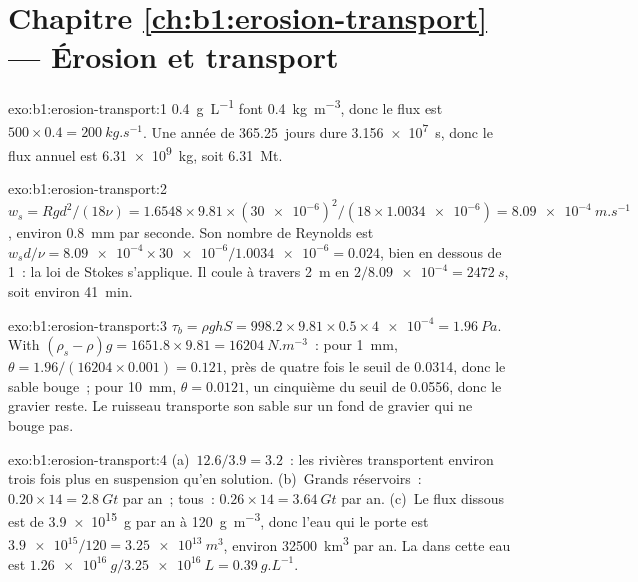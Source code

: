 \section*{Chapitre \ref{ch:b1:erosion-transport} --- Érosion et transport}

\begin{solution}{exo:b1:erosion-transport:1}
\qty{0.4}{g.L^{-1}} font \qty{0.4}{kg.m^{-3}}, donc le flux est $500 \times 0.4 =
\qty{200}{kg.s^{-1}}$. Une année de \num{365.25}~jours dure
\qty{3.156e7}{s}, donc le flux annuel est \qty{6.31e9}{kg}, soit
\qty{6.31}{Mt}.
\end{solution}

\begin{solution}{exo:b1:erosion-transport:2}
$w_s = R g d^2/(18\nu) = 1.6548 \times 9.81 \times (\num{30e-6})^2/(18 \times
\num{1.0034e-6}) = \qty{8.09e-4}{m.s^{-1}}$, environ \qty{0.8}{mm} par seconde. Son
nombre de Reynolds est $w_s d/\nu = \num{8.09e-4} \times
\num{30e-6}/\num{1.0034e-6} = 0.024$, bien en dessous de 1~: la loi de Stokes s'applique. Il
coule à travers \qty{2}{m} en $2/\num{8.09e-4} = \qty{2472}{s}$, soit environ
\qty{41}{min}.
\end{solution}

\begin{solution}{exo:b1:erosion-transport:3}
$\tau_b = \rho g h S = 998.2 \times 9.81 \times 0.5 \times \num{4e-4} =
\qty{1.96}{Pa}$. With $(\rho_s - \rho) g = 1651.8 \times 9.81 =
\qty{16204}{N.m^{-3}}$~: pour \qty{1}{mm}, $\theta = 1.96/(16204 \times 0.001) =
0.121$, près de quatre fois le seuil de \num{0.0314}, donc le sable bouge~; pour
\qty{10}{mm}, $\theta = 0.0121$, un cinquième du seuil de \num{0.0556}, donc le
gravier reste. Le ruisseau transporte son sable sur un fond de gravier qui ne bouge pas.
\end{solution}

\begin{solution}{exo:b1:erosion-transport:4}
(a)~$12.6/3.9 = 3.2$~: les rivières transportent environ trois fois plus en suspension
qu'en solution. (b)~Grands réservoirs~: $0.20 \times 14 = \qty{2.8}{Gt}$ par
an~; tous~: $0.26 \times 14 = \qty{3.64}{Gt}$ par an. (c)~Le flux
dissous est de \qty{3.9e15}{g} par an à \qty{120}{g.m^{-3}}, donc l'eau qui le porte
est $\num{3.9e15}/120 = \qty{3.25e13}{m^3}$, environ \qty{32500}{km^3} par an. La
 dans cette eau est $\qty{1.26e16}{g}/\qty{3.25e16}{L} =
\qty{0.39}{g.L^{-1}}$.
\end{solution}


